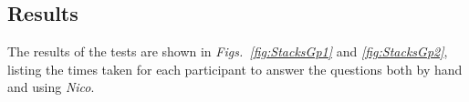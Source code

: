 \documentclass[12pt,twoside,notitlepage,xetex]{report}
\begin{document}
{\subsection{Results}

The results of the tests are shown in \emph{Figs.~\ref{fig:StacksGp1}} and \emph{\ref{fig:StacksGp2}}, listing the times taken for each participant to answer the questions both by hand and using \emph{Nico}.

}
\end{document}
